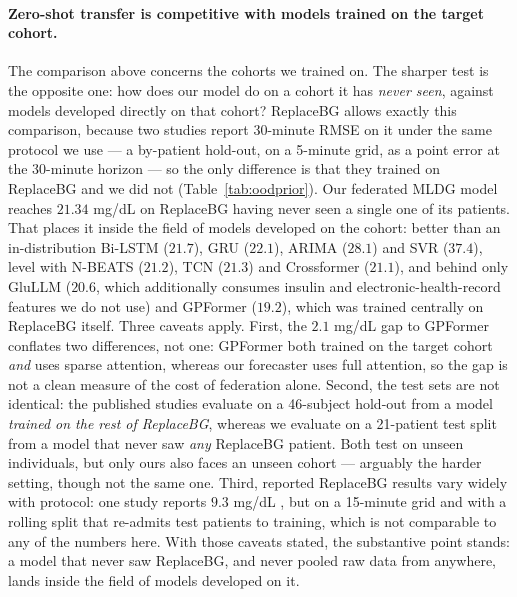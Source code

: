 \documentclass[10pt,letterpaper]{article}
\begin{document}
\paragraph{Zero-shot transfer is competitive with models trained on the target
cohort.} The comparison above concerns the cohorts we trained on. The sharper test
is the opposite one: how does our model do on a cohort it has \emph{never seen},
against models developed directly on that cohort? ReplaceBG allows exactly this
comparison, because two studies report 30-minute RMSE on it under the same
protocol we use --- a by-patient hold-out, on a 5-minute grid, as a point error at
the 30-minute horizon --- so the only difference is that they trained on ReplaceBG
and we did not (Table~\ref{tab:oodprior}). Our federated MLDG model reaches
$21.34$ mg/dL on ReplaceBG having never seen a single one of its patients. That
places it inside the field of models developed on the cohort: better than an
in-distribution Bi-LSTM ($21.7$), GRU ($22.1$), ARIMA ($28.1$) and SVR ($37.4$),
level with N-BEATS ($21.2$), TCN ($21.3$) and Crossformer ($21.1$), and behind
only GluLLM ($20.6$, which additionally consumes insulin and electronic-health-record
features we do not use) and GPFormer ($19.2$), which was trained centrally on
ReplaceBG itself. Three caveats apply. First, the $2.1$ mg/dL gap to
GPFormer conflates two differences, not one: GPFormer both trained on the target
cohort \emph{and} uses sparse attention, whereas our forecaster uses full
attention, so the gap is not a clean measure of the cost of federation
alone. Second, the test sets are not identical: the published studies evaluate on
a 46-subject hold-out from a model \emph{trained on the rest of ReplaceBG}, whereas
we evaluate on a 21-patient test split from a model that never saw \emph{any}
ReplaceBG patient. Both test on unseen individuals, but only ours also faces an
unseen cohort --- arguably the harder setting, though not the same one. Third, reported ReplaceBG results vary widely with protocol: one study
reports $9.3$ mg/dL \cite{jaloli2023cnnlstm}, but on a 15-minute grid and with a
rolling split that re-admits test patients to training, which is not comparable to
any of the numbers here. With those caveats stated, the substantive point stands:
a model that never saw ReplaceBG, and never pooled raw data from anywhere, lands
inside the field of models developed on it.
\end{document}
